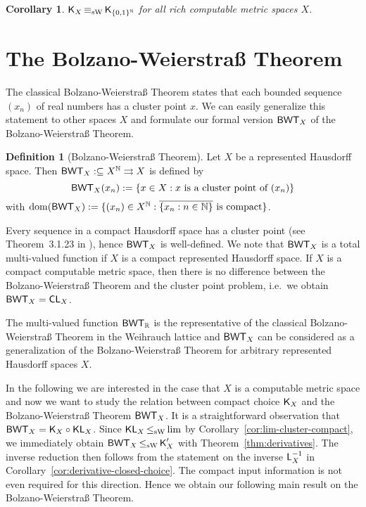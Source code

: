 \documentclass[a4paper]{amsart}
\def\IN{{\mathbb{N}}}
\def\IR{{\mathbb{R}}}
\def\In{\subseteq}
\def\mto{\rightrightarrows}
\def\dom{{\rm dom}}
\def\Cantor{{\{0,1\}^\IN}}
\def\BWT{\text{\rm\sffamily BWT}}
\def\K{\text{\rm\sffamily K}}
\def\L{\text{\rm\sffamily L}}
\def\CL{\text{\rm\sffamily CL}}
\def\KL{\text{\rm\sffamily KL}}
\def\leqSW{\mathop{\leq_{\mathrm{sW}}}}
\def\equivSW{\mathop{\equiv_{\mathrm{sW}}}}
\newtheorem{corollary}[theorem]{Corollary}
\theoremstyle{definition}
\newtheorem{definition}[theorem]{Definition}
\begin{document}
\begin{corollary}
\label{cor:compact-choice-rich}
$\K_X\equivSW\K_\Cantor$ for all rich computable metric spaces $X$.
\end{corollary}


\section{The Bolzano-Weierstra\ss{} Theorem}

The classical Bolzano-Weierstra\ss{} Theorem states that each bounded
sequence $(x_n)$ of real numbers has a cluster point $x$. 
We can easily generalize this statement to other spaces $X$ and formulate
our formal version $\BWT_X$ of the Bolzano-Weierstra\ss{} Theorem.

\begin{definition}[Bolzano-Weierstra\ss{} Theorem]
\label{def:BWT}
Let $X$ be a represented Hausdorff space. Then $\BWT_X:\In X^\IN\mto X$
is defined by
\[\BWT_X(x_n):=\{x\in X:x\mbox{ is a cluster point of $(x_n)$}\}\]
with $\dom(\BWT_X):=\{(x_n)\in X^\IN:\overline{\{x_n:n\in\IN\}}\mbox{ is compact}\}$.
\end{definition}

Every sequence in a compact Hausdorff space has a cluster point (see Theorem~3.1.23 in \cite{Eng89}),
hence $\BWT_X$ is well-defined.
We note that $\BWT_X$ is a total multi-valued function if $X$ is a compact represented Hausdorff space.
If $X$ is a compact computable metric space, then there is no difference between the Bolzano-Weierstra\ss{} Theorem and
the cluster point problem, i.e.\ we obtain $\BWT_X=\CL_X$.

The multi-valued function $\BWT_\IR$ is the representative of 
the classical Bolzano-Weierstra\ss{} Theorem in the Weihrauch lattice
and $\BWT_X$ can be considered as a generalization of the Bolzano-Weierstra\ss{} Theorem
for arbitrary represented Hausdorff spaces $X$.

In the following we are interested in the case that $X$ is a computable metric space
and now we want to study the relation between compact choice $\K_X$ and the 
Bolzano-Weierstra\ss{} Theorem $\BWT_X$.
It is a straightforward observation that $\BWT_X=\K_X\circ\KL_X$. 
Since $\KL_X\leqSW\lim$ by Corollary~\ref{cor:lim-cluster-compact}, we immediately obtain
$\BWT_X\leqSW\K_X'$ with Theorem~\ref{thm:derivatives}.
The inverse reduction then follows from the statement on the inverse $\L_X^{-1}$ in
Corollary~\ref{cor:derivative-closed-choice}. The compact input information is not even
required for this direction.
Hence we obtain our following main result on the Bolzano-Weierstra\ss{} Theorem.
\end{document}
